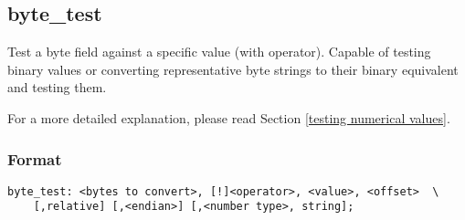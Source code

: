 \documentclass[english]{report}
\begin{document}
\subsection{byte\_test\label{sub:byte_test}}

Test a byte field against a specific value (with operator).  Capable
 of testing binary values or converting representative byte strings to
their binary equivalent and testing them.

For a more detailed explanation, please read Section \ref{testing numerical values}.

\subsubsection{Format}

\begin{verbatim}
byte_test: <bytes to convert>, [!]<operator>, <value>, <offset>  \
    [,relative] [,<endian>] [,<number type>, string];
\end{verbatim}
			
\end{document}
